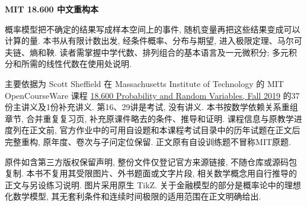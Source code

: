 \frontmatter
\begin{center}
{\color{structurecolor}\bfseries\fontsize{18}{25}\selectfont\BookTitle\par}
{\bfseries MIT 18.600 中文重构本\par}
\BookAuthor\par
\BookDate\par
\end{center}
\originalpreface
概率模型把不确定的结果写成样本空间上的事件, 随机变量再把这些结果变成可以计算的量. 本书从有限计数出发, 经条件概率、分布与期望, 进入极限定理、马尔可夫链、熵和鞅. 读者需掌握中学代数、排列组合的基本语言及一元微积分; 多元积分和所需的线性代数在使用处说明.

主要依据为 Scott Sheffield 在 Massachusetts Institute of Technology 的 MIT OpenCourseWare 课程 \href{https://ocw.mit.edu/courses/18-600-probability-and-random-variables-fall-2019/pages/lecture-notes/}{18.600 Probability and Random Variables, Fall 2019} 的37份主讲义及1份补充讲义. 第16、29讲是考试, 没有讲义. 本书按数学依赖关系重组章节, 合并重复复习页, 补充原课件略去的条件、推导和证明. 课程信息与原教学进度列在正文前, 官方作业中的可用自设题和本课程考试目录中的历年试题在正文后完整重构, 原年度、卷次与子问定位保留. 正文原有自设训练题不冒称MIT原题.

原件如含第三方版权保留声明, 整份文件仅登记官方来源链接, 不随仓库或源码包复制. 本书不复用其受限图片、外书题面或文字片段, 相关数学概念用自行推导的正文与另设练习说明. 图片采用原生 TikZ. 关于金融模型的部分是概率论中的理想化数学模型, 其无套利条件和连续时间极限的适用范围在正文明确给出.

